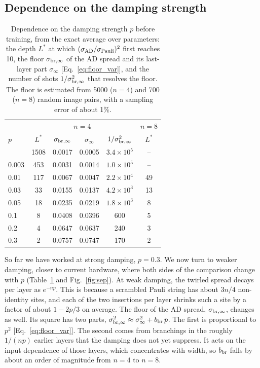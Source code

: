 \documentclass[
 aps,pra,
 twocolumn,
 superscriptaddress,
 longbibliography,
 nofootinbib
]{revtex4-2}
\newcommand{\AD}{\mathrm{AD}}
\begin{document}
\subsection{Dependence on the damping strength}
\label{sec:pdep}

\begin{table}[t]
\caption{Dependence on the damping strength $p$ before training, from the
exact average over parameters: the depth $L^*$ at which
$(\sigma_{\AD}/\sigma_{\rm Pauli})^2$ first reaches 10, the floor
$\sigma_{\rm br,\infty}$ of the AD spread and its last-layer part $\sigma_\infty$
[Eq.~\eqref{eq:floor_var}], and the number of shots
$1/\sigma_{\rm br,\infty}^2$ that resolves the floor. The floor is estimated from 5000 ($n=4$) and 700 ($n=8$) random image pairs, with a sampling error of about 1\%.}
\label{tab:pdep}
\begin{ruledtabular}
\begin{tabular}{lccccc}
 & \multicolumn{4}{c}{$n=4$} & $n=8$\\
$p$ & $L^*$ & $\sigma_{\rm br,\infty}$ & $\sigma_\infty$ & $1/\sigma_{\rm br,\infty}^2$ & $L^*$\\
\colrule
0.001 & 1508 & 0.0017 & 0.0005 & $3.4\times10^5$ & --\\
0.003 & 453 & 0.0031 & 0.0014 & $1.0\times10^5$ & --\\
0.01 & 117 & 0.0067 & 0.0047 & $2.2\times10^4$ & 49\\
0.03 & 33 & 0.0155 & 0.0137 & $4.2\times10^3$ & 13\\
0.05 & 18 & 0.0235 & 0.0219 & $1.8\times10^3$ & 8\\
0.1 & 8 & 0.0408 & 0.0396 & 600 & 5\\
0.2 & 4 & 0.0647 & 0.0637 & 240 & 3\\
0.3 & 2 & 0.0757 & 0.0747 & 170 & 2\\
\end{tabular}
\end{ruledtabular}
\end{table}

So far we have worked at strong damping, $p=0.3$. We now turn to weaker
damping, closer to current hardware, where both sides of the comparison change
with $p$ (Table~\ref{tab:pdep} and Fig.~\ref{fig:sep}). At weak damping,
the twirled spread decays per layer as $e^{-np}$. This is because a scrambled
Pauli string has about $3n/4$ non-identity sites, and each of the two
insertions per layer shrinks such a site by a factor of about $1-2p/3$ on
average. The floor of the AD spread, $\sigma_{\rm br,\infty}$, changes as well.
Its square has two parts,
$\sigma_{\rm br,\infty}^2\approx\sigma_\infty^2+b_{\rm br}\,p$. The first is
proportional to $p^2$ [Eq.~\eqref{eq:floor_var}]. The second comes from
branchings in the roughly $1/(np)$ earlier layers that the damping does not yet
suppress. It acts on the input dependence of those layers, which concentrates
with width, so $b_{\rm br}$ falls by about an order of magnitude from $n=4$ to
$n=8$.
\end{document}
